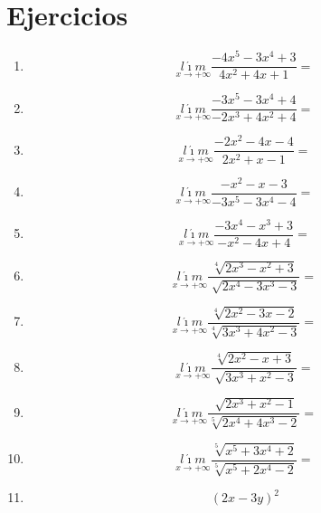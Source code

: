\documentclass[oneside,spanish,letter]{article}
\begin{document}
\section{Ejercicios}
\begin{enumerate}
 \item $$\underset{x\rightarrow +\infty}{l\acute{\imath}m} \frac{-4x^5-3x^4+3}{4x^2+4x+1}=$$
 \item $$\underset{x\rightarrow +\infty}{l\acute{\imath}m} \frac{-3x^5-3x^4+4}{-2x^3+4x^2+4}=$$
 \item $$\underset{x\rightarrow +\infty}{l\acute{\imath}m} \frac{-2x^2-4x-4}{2x^2+x-1}=$$
 \item $$\underset{x\rightarrow +\infty}{l\acute{\imath}m} \frac{-x^2-x-3}{-3x^5-3x^4-4}=$$
 \item $$\underset{x\rightarrow +\infty}{l\acute{\imath}m} \frac{-3x^4-x^3+3}{-x^2-4x+4}=$$
 \item $$\underset{x\rightarrow +\infty}{l\acute{\imath}m} \frac{\sqrt[4]{2x^3-x^2+3}}{\sqrt[]{2x^4-3x^3-3}}=$$
 \item $$\underset{x\rightarrow +\infty}{l\acute{\imath}m} \frac{\sqrt[4]{2x^2-3x-2}}{\sqrt[4]{3x^3+4x^2-3}}=$$
 \item $$\underset{x\rightarrow +\infty}{l\acute{\imath}m} \frac{\sqrt[4]{2x^2-x+3}}{\sqrt[]{3x^3+x^2-3}}=$$
 \item $$\underset{x\rightarrow +\infty}{l\acute{\imath}m} \frac{\sqrt[]{2x^3+x^2-1}}{\sqrt[5]{2x^4+4x^3-2}}=$$
 \item $$\underset{x\rightarrow +\infty}{l\acute{\imath}m} \frac{\sqrt[5]{x^5+3x^4+2}}{\sqrt[5]{x^5+2x^4-2}}=$$
\item $$(2x-3y)^2$$
 \end{enumerate}
  \newpage
\end{document}

